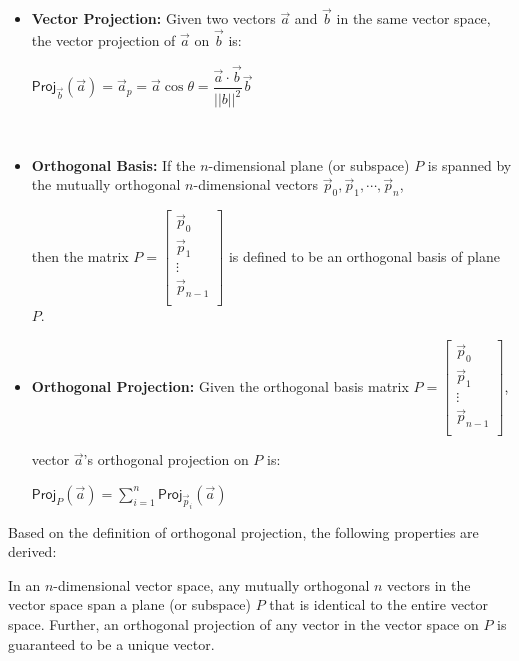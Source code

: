 \begin{tcolorbox}[title={\textbf{\tboxdef{\ref*{subsec:projection}} Vector and Orthogonal Projections}}]

\begin{itemize}

\item \textbf{Vector Projection:} Given two vectors $\vec{a}$ and $\vec{b}$ in the same vector space, the vector projection of $\vec{a}$ on $\vec{b}$ is:

$\textsf{Proj}_{\vec{b}}(\vec{a}) = \vec{a}_p = \vec{a} \cos \theta = \dfrac{\vec{a} \cdot \vec{b}}{||b||^2} \vec{b}$

$ $

\item \textbf{Orthogonal Basis:} If the $n$-dimensional plane (or subspace) $P$ is spanned by the mutually orthogonal $n$-dimensional vectors $\vec{p}_0, \vec{p}_1, \cdots, \vec{p}_n$, 

then the matrix $P = \begin{bmatrix} 
\vec{p}_0\\
\vec{p}_1\\
\vdots\\
\vec{p}_{n-1}\\
\end{bmatrix}
$
is defined to be an orthogonal basis of plane $P$. 


\item \textbf{Orthogonal Projection:} Given the orthogonal basis matrix $P = \begin{bmatrix} 
\vec{p}_0\\
\vec{p}_1\\
\vdots\\
\vec{p}_{n-1}\\
\end{bmatrix}
$, 

vector $\vec{a}$'s orthogonal projection on $P$ is:

$\textsf{Proj}_P(\vec{a}) = \sum\limits_{i=1}^n \textsf{Proj}_{\vec{p}_i}(\vec{a})$



\end{itemize}


\end{tcolorbox}


Based on the definition of orthogonal projection, the following properties are derived:  

 In an $n$-dimensional vector space, any mutually orthogonal $n$ vectors in the vector space span a plane (or subspace) $P$ that is identical to the entire vector space. Further, an orthogonal projection of any vector in the vector space on $P$ is guaranteed to be a unique vector.

